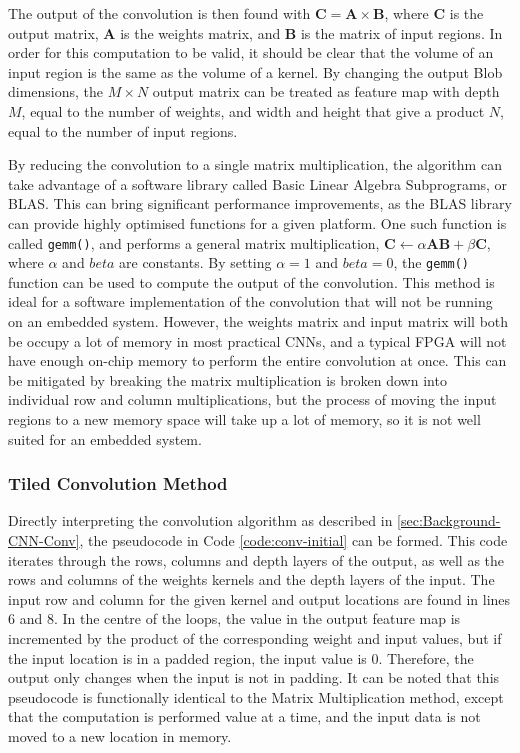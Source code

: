 \documentclass[12pt]{article}
\begin{document}
The output of the convolution is then found with \( \mathbf{C} = \mathbf{A}\times\mathbf{B}\), where $\mathbf{C}$ is the output matrix, $\mathbf{A}$ is the weights matrix, and $\mathbf{B}$ is the matrix of input regions. In order for this computation to be valid, it should be clear that the volume of an input region is the same as the volume of a kernel. By changing the output Blob dimensions, the $M \times N$ output matrix can be treated as feature map with depth $M$, equal to the number of weights, and width and height that give a product $N$, equal to the number of input regions.

By reducing the convolution to a single matrix multiplication, the algorithm can take advantage of a software library called Basic Linear Algebra Subprograms, or BLAS. This can bring significant performance improvements, as the BLAS library can provide highly optimised functions for a given platform. One such function is called \lstinline|gemm()|, and performs a general matrix multiplication, $\mathbf{C} \gets \alpha\mathbf{A}\mathbf{B} + \beta\mathbf{C}$, where $\alpha$ and $beta$ are constants. By setting $\alpha = 1$ and $beta = 0$, the \lstinline|gemm()| function can be used to compute the output of the convolution. This method is ideal for a software implementation of the convolution that will not be running on an embedded system. However, the weights matrix and input matrix will both be occupy a lot of memory in most practical CNNs, and a typical FPGA will not have enough on-chip memory to perform the entire convolution at once. This can be mitigated by breaking the matrix multiplication is broken down into individual row and column multiplications, but the process of moving the input regions to a new memory space will take up a lot of memory, so it is not well suited for an embedded system.

\subsubsection{Tiled Convolution Method}
\label{sec:Imp-Conv-PC}

Directly interpreting the convolution algorithm as described in \ref{sec:Background-CNN-Conv}, the pseudocode in Code \ref{code:conv-initial} can be formed. This code iterates through the rows, columns and depth layers of the output, as well as the rows and columns of the weights kernels and the depth layers of the input. The input row and column for the given kernel and output locations are found in lines 6 and 8. In the centre of the loops, the value in the output feature map is incremented by the product of the corresponding weight and input values, but if the input location is in a padded region, the input value is 0. Therefore, the output only changes when the input is not in padding. It can be noted that this pseudocode is functionally identical to the Matrix Multiplication method, except that the computation is performed value at a time, and the input data is not moved to a new location in memory.
\end{document}
